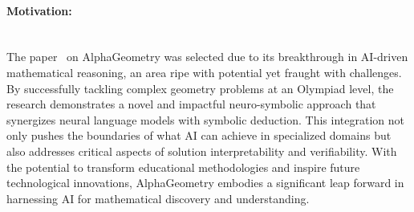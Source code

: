 \documentclass[12pt]{article}
\begin{document}
\paragraph{Motivation:}
~\\
The paper~\cite{4893487} on AlphaGeometry was selected due to its breakthrough in AI-driven mathematical reasoning, an area ripe with potential yet fraught with challenges. By successfully tackling complex geometry problems at an Olympiad level, the research demonstrates a novel and impactful neuro-symbolic approach that synergizes neural language models with symbolic deduction. This integration not only pushes the boundaries of what AI can achieve in specialized domains but also addresses critical aspects of solution interpretability and verifiability. With the potential to transform educational methodologies and inspire future technological innovations, AlphaGeometry embodies a significant leap forward in harnessing AI for mathematical discovery and understanding.



\end{document}
